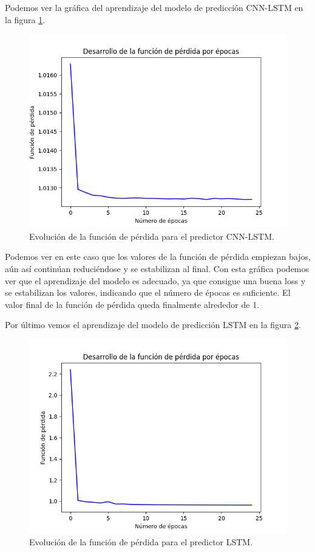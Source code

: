 Podemos ver la gráfica del aprendizaje del modelo de predicción CNN-LSTM en la figura \ref{img:loss-cnn-lstm-forecaster}.
\begin{figure}[]
	\centering
	\includegraphics[scale=0.75]{imagenes/loss_cnn_lstm_forecaster.png}
	\caption{Evolución de la función de pérdida para el predictor CNN-LSTM.}
	\label{img:loss-cnn-lstm-forecaster}
\end{figure}

Podemos ver en este caso que los valores de la función de pérdida empiezan bajos, aún así continúan reduciéndose y se estabilizan al final. Con esta gráfica podemos ver que el aprendizaje del modelo es adecuado, ya que consigue una buena loss y se estabilizan los valores, indicando que el número de épocas es suficiente. El valor final de la función de pérdida queda finalmente alrededor de 1.

Por último vemos el aprendizaje del modelo de predicción LSTM en la figura \ref{img:loss-lstm-forecaster}.
\begin{figure}[]
	\centering
	\includegraphics[scale=0.75]{imagenes/loss_lstm_forecasting.png}
	\caption{Evolución de la función de pérdida para el predictor LSTM.}
	\label{img:loss-lstm-forecaster}
\end{figure}

